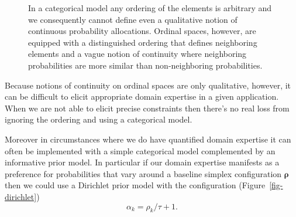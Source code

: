 \documentclass[
  letterpaper,
  DIV=11,
  numbers=noendperiod]{scrartcl}
\begin{document}
\begin{figure}


\caption{\label{fig-continuity}In a categorical model any ordering of
the elements is arbitrary and we consequently cannot define even a
qualitative notion of continuous probability allocations. Ordinal
spaces, however, are equipped with a distinguished ordering that defines
neighboring elements and a vague notion of continuity where neighboring
probabilities are more similar than non-neighboring probabilities.}

\end{figure}%

Because notions of continuity on ordinal spaces are only qualitative,
however, it can be difficult to elicit appropriate domain expertise in a
given application. When we are not able to elicit precise constraints
then there's no real loss from ignoring the ordering and using a
categorical model.

Moreover in circumstances where we do have quantified domain expertise
it can often be implemented with a simple categorical model complemented
by an informative prior model. In particular if our domain expertise
manifests as a preference for probabilities that vary around a baseline
simplex configuration \(\boldsymbol{\rho}\) then we could use a
Dirichlet prior model with the configuration
(Figure~\ref{fig-dirichlet}) \[
\alpha_{k} = \rho_{k} / \tau + 1.
\]
\end{document}
